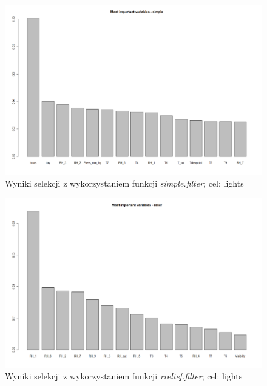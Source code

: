 \documentclass[a4paper,11pt,twoside]{mwrep}  %
\begin{document}
 \begin{figure}[!h]
    \centering \includegraphics[scale=0.4]{../simple_lights.png}
    \caption{Wyniki selekcji z wykorzystaniem funkcji \textit{simple.filter}; cel: lights}
    \label{fig:simple_lights}
\end{figure}

 \begin{figure}[!h]
    \centering \includegraphics[scale=0.4]{../relief_lights.png}
    \caption{Wyniki selekcji z wykorzystaniem  funkcji \textit{rrelief.filter}; cel: lights}
    \label{fig:relief_lights}
\end{figure}
\end{document}
